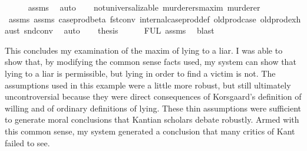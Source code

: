 \begin{isabellebody}
\ \ \ \ \isamarkupfalse%
\ assms{\isacharparenleft}{}{\isacharparenright}\ \isamarkupfalse%
\ auto\isanewline
\ \ \isamarkupfalse%
\ {\isachardoublequoteopen}not{\isacharunderscore}universalizable\ murderers{\isacharunderscore}maxim\ murderer{\isachardoublequoteclose}\isanewline
\ \ \ \ \isamarkupfalse%
\ assms{\isacharparenleft}{}{\isacharparenright}\ assms{\isacharparenleft}{}{\isacharparenright}\ case{\isacharunderscore}prod{\isacharunderscore}beta\ fst{\isacharunderscore}conv\ internal{\isacharunderscore}case{\isacharunderscore}prod{\isacharunderscore}def\ old{\isachardot}prod{\isachardot}case\ old{\isachardot}prod{\isachardot}exhaust\ snd{\isacharunderscore}conv\ \isamarkupfalse%
\ auto\isanewline
\ \ \isamarkupfalse%
\ {\isacharquery}thesis\isanewline
\ \ \ \ \isamarkupfalse%
\ FUL\ assms{\isacharparenleft}{}{\isacharparenright}\ \isamarkupfalse%
\ blast\ \isanewline
{}\isamarkupfalse%
%
\endisatagproof
{\isafoldproof}%
%
\isadelimproof
%
\endisadelimproof
%
\begin{isamarkuptext}%
This concludes my examination of the maxim of lying to a liar. I was able to show that, by
modifying the common sense facts used, my system can show that lying to a liar is permissible, but lying 
in order to find a victim is not. The assumptions used in this example were a little more robust, but still
ultimately uncontroversial because they were direct consequences of Korsgaard's definition of willing 
and of ordinary definitions of lying. These thin assumptions were sufficient to generate moral conclusions
that Kantian scholars debate robustly. Armed with this common sense, my system generated 
a conclusion that many critics of Kant failed to see.


\end{isamarkuptext}
\end{isabellebody}
